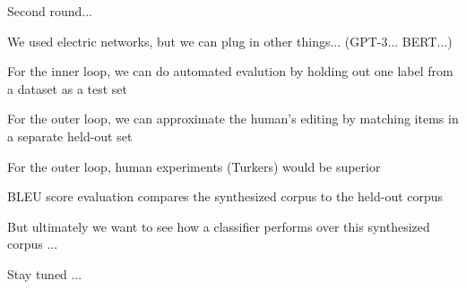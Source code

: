 \documentclass[12pt]{beamer}
\begin{document}
\begin{frame}{}
  Second round...
\end{frame}

\begin{frame}{}
  We used electric networks, but we can plug in other things... (GPT-3... BERT...)
\end{frame}

\begin{frame}{}
  For the inner loop, we can do automated evalution by holding out one label from a dataset as a test set
\end{frame}

\begin{frame}{}
  For the outer loop, we can approximate the human's editing by matching items in a separate held-out set
\end{frame}

\begin{frame}{}
  For the outer loop, human experiments (Turkers) would be superior
\end{frame}

\begin{frame}{}
  BLEU score evaluation compares the synthesized corpus to the held-out corpus
\end{frame}

\begin{frame}{}
  But ultimately we want to see how a classifier performs over this synthesized
  corpus ...

  Stay tuned ...
\end{frame}
\end{document}
